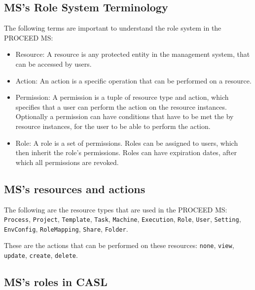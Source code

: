 \subsection{MS's Role System Terminology}
\label{cha:relatedwork:proceedroles:terminology}

The following terms are important to understand the role system in the PROCEED MS:

\begin{itemize}
  \item Resource: A resource is any protected entity in the management system, that can be
    accessed by users.
  \item Action: An action is a specific operation that can be performed on a resource.
  \item Permission: A permission is a tuple of resource type and action, which specifies that a
    user can perform the action on the resource instances. Optionally a permission can have
    conditions that have to be met the by resource instances, for the user to be able to perform the action.
  \item Role: A role is a set of permissions. Roles can be assigned to users, which then
    inherit the role's permissions. Roles can have expiration dates, after which all
    permissions are revoked.
\end{itemize}

\subsection{MS's resources and actions}
\label{cha:relatedwork:proceedroles:ms-resources-actions}

The following are the resource types that are used in the PROCEED MS:
  \lstinline{Process}, 
  \lstinline{Project},
  \lstinline{Template},
  \lstinline{Task},
  \lstinline{Machine},
  \lstinline{Execution},
  \lstinline{Role},
  \lstinline{User},
  \lstinline{Setting},
  \lstinline{EnvConfig},
  \lstinline{RoleMapping},
  \lstinline{Share},
  \lstinline{Folder}.


These are the actions that can be performed on these resources:
  \lstinline{none},
  \lstinline{view},
  \lstinline{update},
  \lstinline{create},
  \lstinline{delete}.

\subsection{MS's roles in CASL}
\label{cha:relatedwork:proceedroles:casl}

